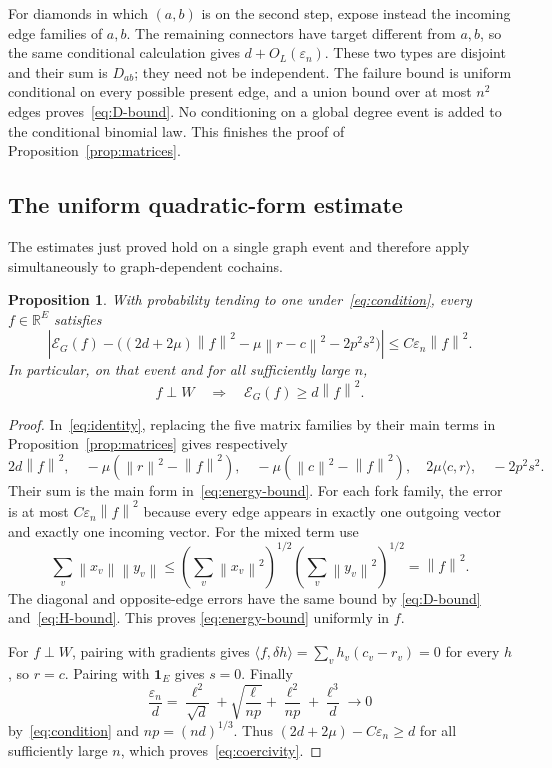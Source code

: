 \documentclass[11pt]{article}
\newtheorem{proposition}[theorem]{Proposition}
\theoremstyle{remark}
\newcommand{\R}{\mathbb R}
\newcommand{\one}{\mathbf 1}
\newcommand{\norm}[1]{\left\lVert#1\right\rVert}
\newcommand{\ip}[2]{\langle#1,#2\rangle}
\begin{document}
For diamonds in which $(a,b)$ is on the second step, expose instead the
incoming edge families of $a,b$. The remaining connectors have target
different from $a,b$, so the same conditional calculation gives
$d+O_L(\varepsilon_n)$. These two types are disjoint and their sum is
$D_{ab}$; they need not be independent. The failure bound is uniform
conditional on every possible present edge, and a union bound over
at most $n^2$ edges proves~\eqref{eq:D-bound}.
No conditioning on a global degree event is added to the conditional
binomial law. This finishes the proof of Proposition~\ref{prop:matrices}.

\subsection{The uniform quadratic-form estimate}

The estimates just proved hold on a single graph event and therefore
apply simultaneously to graph-dependent cochains.

\begin{proposition}\label{prop:energy}
With probability tending to one under~\eqref{eq:condition}, every
$f\in\R^E$ satisfies
\begin{equation}\label{eq:energy-bound}
 \left|\mathcal E_G(f)-
 \bigl((2d+2\mu)\norm f^2-\mu\norm{r-c}^2-2p^2s^2\bigr)\right|
 \leq C\varepsilon_n\norm f^2.
\end{equation}
In particular, on that event and for all sufficiently large $n$,
\begin{equation}\label{eq:coercivity}
 f\perp W\quad\Longrightarrow\quad
          \mathcal E_G(f)\geq d\norm f^2.
\end{equation}
\end{proposition}
\begin{proof}
In~\eqref{eq:identity}, replacing the five matrix families by their main
terms in Proposition~\ref{prop:matrices} gives respectively
\[
 2d\norm f^2,\quad
 -\mu(\norm r^2-\norm f^2),\quad
 -\mu(\norm c^2-\norm f^2),\quad
 2\mu\ip c r,\quad -2p^2s^2.
\]
Their sum is the main form in~\eqref{eq:energy-bound}.
For each fork family, the error is at most $C\varepsilon_n\norm f^2$
because every edge appears in exactly one outgoing vector and exactly
one incoming vector. For the mixed term use
\[
 \sum_v\norm{x_v}\norm{y_v}
 \leq\left(\sum_v\norm{x_v}^2\right)^{1/2}
      \left(\sum_v\norm{y_v}^2\right)^{1/2}=\norm f^2.
\]
The diagonal and opposite-edge errors have the same bound by
\eqref{eq:D-bound} and~\eqref{eq:H-bound}. This proves
\eqref{eq:energy-bound} uniformly in $f$.

For $f\perp W$, pairing with gradients gives
$\ip f{\delta h}=\sum_vh_v(c_v-r_v)=0$ for every $h$, so $r=c$.
Pairing with $\one_E$ gives $s=0$. Finally
\[
 \frac{\varepsilon_n}{d}
 =\frac{\ell^2}{\sqrt d}+\sqrt{\frac{\ell}{np}}
        +\frac{\ell^2}{np}+\frac{\ell^3}{d}\longrightarrow0
\]
by~\eqref{eq:condition} and $np=(nd)^{1/3}$.
Thus $(2d+2\mu)-C\varepsilon_n\geq d$ for all sufficiently large $n$,
which proves~\eqref{eq:coercivity}.
\end{proof}
\end{document}

